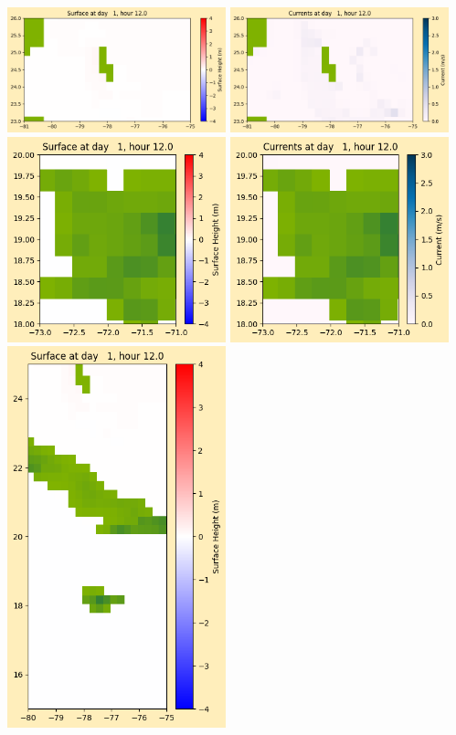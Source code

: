 \documentclass[11pt]{article}
\begin{document}
\vskip 10pt 
\includegraphics[width=0.475\textwidth]{frame0018fig1003.png}
\includegraphics[width=0.475\textwidth]{frame0018fig1004.png}
\vskip 10pt 
\includegraphics[width=0.475\textwidth]{frame0018fig1005.png}
\includegraphics[width=0.475\textwidth]{frame0018fig1006.png}
\vskip 10pt 
\includegraphics[width=0.475\textwidth]{frame0018fig1007.png}
\end{document}
